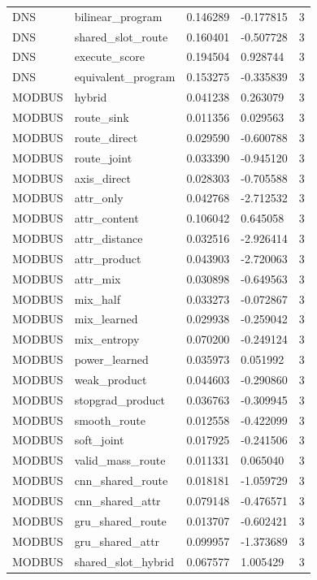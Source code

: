 \begin{tabular}{lllll}
DNS & bilinear\_program & 0.146289 & -0.177815 & 3 \\
DNS & shared\_slot\_route & 0.160401 & -0.507728 & 3 \\
DNS & execute\_score & 0.194504 & 0.928744 & 3 \\
DNS & equivalent\_program & 0.153275 & -0.335839 & 3 \\
MODBUS & hybrid & 0.041238 & 0.263079 & 3 \\
MODBUS & route\_sink & 0.011356 & 0.029563 & 3 \\
MODBUS & route\_direct & 0.029590 & -0.600788 & 3 \\
MODBUS & route\_joint & 0.033390 & -0.945120 & 3 \\
MODBUS & axis\_direct & 0.028303 & -0.705588 & 3 \\
MODBUS & attr\_only & 0.042768 & -2.712532 & 3 \\
MODBUS & attr\_content & 0.106042 & 0.645058 & 3 \\
MODBUS & attr\_distance & 0.032516 & -2.926414 & 3 \\
MODBUS & attr\_product & 0.043903 & -2.720063 & 3 \\
MODBUS & attr\_mix & 0.030898 & -0.649563 & 3 \\
MODBUS & mix\_half & 0.033273 & -0.072867 & 3 \\
MODBUS & mix\_learned & 0.029938 & -0.259042 & 3 \\
MODBUS & mix\_entropy & 0.070200 & -0.249124 & 3 \\
MODBUS & power\_learned & 0.035973 & 0.051992 & 3 \\
MODBUS & weak\_product & 0.044603 & -0.290860 & 3 \\
MODBUS & stopgrad\_product & 0.036763 & -0.309945 & 3 \\
MODBUS & smooth\_route & 0.012558 & -0.422099 & 3 \\
MODBUS & soft\_joint & 0.017925 & -0.241506 & 3 \\
MODBUS & valid\_mass\_route & 0.011331 & 0.065040 & 3 \\
MODBUS & cnn\_shared\_route & 0.018181 & -1.059729 & 3 \\
MODBUS & cnn\_shared\_attr & 0.079148 & -0.476571 & 3 \\
MODBUS & gru\_shared\_route & 0.013707 & -0.602421 & 3 \\
MODBUS & gru\_shared\_attr & 0.099957 & -1.373689 & 3 \\
MODBUS & shared\_slot\_hybrid & 0.067577 & 1.005429 & 3 \\

\end{tabular}
